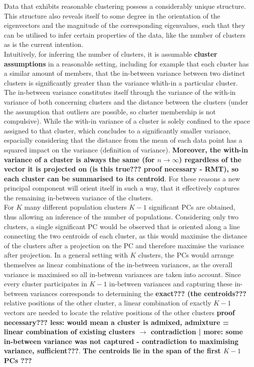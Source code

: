 \documentclass[a4paper, 11pt]{article}
\begin{document}
Data that exhibits reasonable clustering possess a considerably unique structure. This structure also reveals itself to some degree in the orientation of the eigenvectors and the magnitude of the corresponding eigenvalues, such that they can be utilised to infer certain properties of the data, like the number of clusters as is the current intention. \\
Intuitively, for inferring the number of clusters, it is assumable \textbf{cluster assumptions} in a reasonable setting, including for example that each cluster has a similar amount of members, that the in-between variance between two distinct clusters is significantly greater than the variance whith-in a particular cluster. The in-between variance constitutes itself through the variance of the with-in variance of both concerning clusters and the distance between the clusters (under the assumption that outliers are possible, so cluster membership is not compulsive). While the with-in variance of a cluster is solely confined to the space assigned to that cluster, which concludes to a significantly smaller variance, espacially considering that the distance from the mean of each data point has a squared impact on the variance (definition of variance). \textbf{ Moreover, the with-in variance of a cluster is always the same (for $n \rightarrow \infty$) regardless of the vector it is projected on (is this true??? proof necessary - RMT), so each cluster can be summarised to its centroid}. For these reasons a new principal component will orient itself in such a way, that it effectively captures the remaining in-between variance of the clusters. \\
For $K$ many different population clusters $K-1$ significant PCs are obtained, thus allowing an inference of the number of populations. Considering only two clusters, a single significant PC would be observed that is oriented along a line connecting the two centroids of each cluster, as this would maximise the distance of the clusters after a projection on the PC and therefore maximise the variance after projection. In a general setting with $K$ clusters, the PCs would arrange themselves as linear combinations of the in-between variances, as the overall variance is maximised so all in-betwenn variances are taken into account. Since every cluster participates in $K-1$ in-between variances and capturing these in-between variances corresponds to determining the \textbf{exact??? (the centroids???} relative positions of the other cluster, a linear combination of exactly $K-1$ vectors are needed to locate the relative positions of the other clusters \textbf{proof necessary??? less: would mean a cluster is admixed, admixture = linear combination of existing clusters $\rightarrow$ contradiction | more: some in-between variance was not captured - contradiction to maximising variance, sufficient???}. \textbf{The centroids lie in the span of the first $K-1$ PCs ???}
\end{document}
